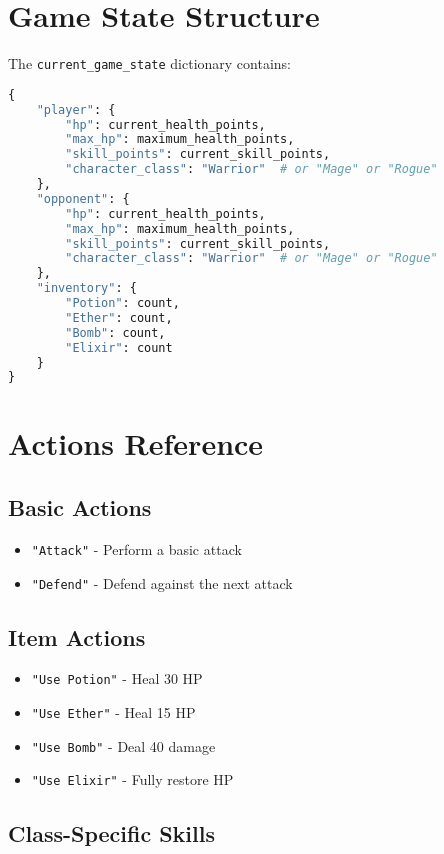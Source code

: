 \documentclass[12pt]{article}
\begin{document}
\section{Game State Structure}
\label{sec:game-state}

The \texttt{current\_game\_state} dictionary contains:

\begin{lstlisting}[language=Python, caption=Game State Structure]
{
    "player": {
        "hp": current_health_points,
        "max_hp": maximum_health_points,
        "skill_points": current_skill_points,
        "character_class": "Warrior"  # or "Mage" or "Rogue"
    },
    "opponent": {
        "hp": current_health_points,
        "max_hp": maximum_health_points,
        "skill_points": current_skill_points,
        "character_class": "Warrior"  # or "Mage" or "Rogue"
    },
    "inventory": {
        "Potion": count,
        "Ether": count,
        "Bomb": count,
        "Elixir": count
    }
}
\end{lstlisting}

\section{Actions Reference}
\label{sec:actions}

\subsection{Basic Actions}
\begin{itemize}
    \item \texttt{"Attack"} - Perform a basic attack
    \item \texttt{"Defend"} - Defend against the next attack
\end{itemize}

\subsection{Item Actions}
\begin{itemize}
    \item \texttt{"Use Potion"} - Heal 30 HP
    \item \texttt{"Use Ether"} - Heal 15 HP  
    \item \texttt{"Use Bomb"} - Deal 40 damage
    \item \texttt{"Use Elixir"} - Fully restore HP
\end{itemize}

\subsection{Class-Specific Skills}
\label{subsec:skills}
\end{document}
